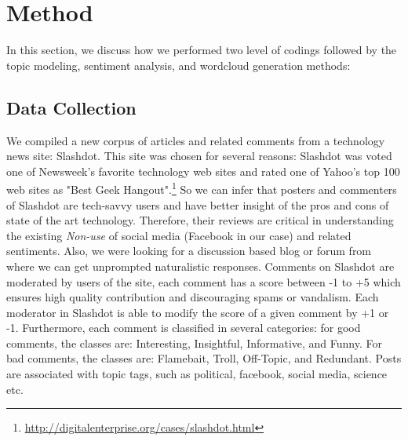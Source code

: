\section{Method}
\label{sec:method}

In this section, we discuss how we performed two level of codings followed by the topic modeling, sentiment analysis, and wordcloud generation methods:

\subsection{Data Collection}
We compiled a new corpus of articles and related comments from a technology news site: Slashdot. This site was chosen for several reasons: Slashdot was voted one of Newsweek's favorite technology web sites and rated one of Yahoo's top 100 web sites as "Best Geek Hangout".\footnote{\url{http://digitalenterprise.org/cases/slashdot.html}} So we can infer that posters and commenters of Slashdot are tech-savvy users and have better insight of the pros and cons of state of the art technology. Therefore, their reviews are critical in understanding the existing \emph{Non-use} of social media (Facebook in our case) and related sentiments. Also, we were looking for a discussion based blog or forum from where we can get unprompted naturalistic responses. Comments on Slashdot are moderated by users of the site, each comment has a score between -1 to +5 which ensures high quality contribution and discouraging spams or vandalism. Each moderator in Slashdot is able to modify the score of a given comment by +1 or -1. Furthermore, each comment is classified in several categories: for good comments, the classes are: Interesting, Insightful, Informative, and Funny. For bad comments, the classes are: Flamebait, Troll, Off-Topic, and Redundant. Posts are associated with topic tags, such as political, facebook, social media, science etc. 

